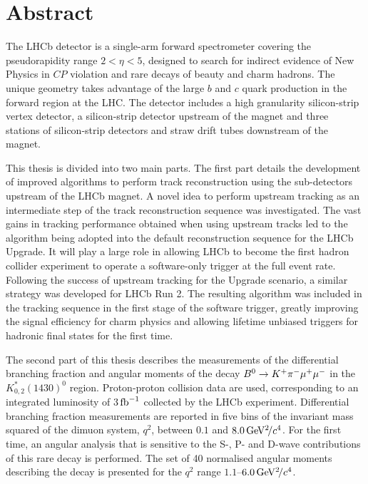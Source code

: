 \section*{Abstract}

The LHCb detector is a single-arm forward spectrometer covering the pseudorapidity range $2 < \eta < 5$, designed to search for indirect evidence of New Physics in $C\!P$ violation and rare decays of beauty and charm hadrons. The unique geometry takes advantage of the large $b$ and $c$ quark production in the forward region at the LHC. The detector includes a high granularity silicon-strip vertex detector, a silicon-strip detector upstream of the magnet and three stations of silicon-strip detectors and straw drift tubes downstream of the magnet.

This thesis is divided into two main parts. The first part details the development of improved algorithms to perform track reconstruction using the sub-detectors upstream of the LHCb magnet. A novel idea to perform upstream tracking as an intermediate step of the track reconstruction sequence was investigated. The vast gains in tracking performance obtained when using upstream tracks led to the algorithm being adopted into the default reconstruction sequence for the LHCb Upgrade. It will play a large role in allowing LHCb to become the first hadron collider experiment to operate a software-only trigger at the full event rate. Following the success of upstream tracking for the Upgrade scenario, a similar strategy was developed for LHCb Run 2. The resulting algorithm was included in the tracking sequence in the first stage of the software trigger, greatly improving the signal efficiency for charm physics and allowing lifetime unbiased triggers for hadronic final states for the first time.

The second part of this thesis describes the measurements of the differential branching fraction and angular moments of the decay ${B}^{0} \rightarrow K^{+}\pi^{-}\mu^{+}\mu^{-}$ in the $K^{*}_{0,2}(1430)^{0}$ region. Proton-proton collision data are used, corresponding to an integrated luminosity of 3$\mbox{\,fb}^{-1}$ collected by the LHCb experiment. Differential branching fraction measurements are reported in five bins of the invariant mass squared of the dimuon system, $q^{2}$, between $0.1$ and $8.0{\mathrm{\,Ge\kern -0.1em V^2\!/}c^4}$. For the first time, an angular analysis that is sensitive to the S-, P- and D-wave contributions of this rare decay is performed. The set of 40 normalised angular moments describing the decay is presented for the $q^{2}$ range $1.1$--$6.0{\mathrm{\,Ge\kern -0.1em V^2\!/}c^4}$. 

